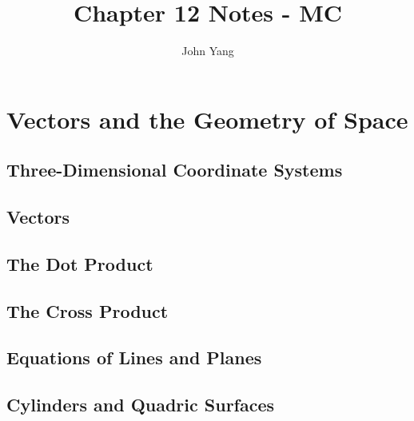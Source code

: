 \documentclass{article}
\title{Chapter 12 Notes - MC} %
\author{John Yang}
\begin{document}
    \maketitle
    \tableofcontents
    \section{Vectors and the Geometry of Space} %
    \subsection{Three-Dimensional Coordinate Systems} %
    \begin{outline}
        
    \end{outline}
    \subsection{Vectors}
    \begin{outline}
        
    \end{outline}
    \subsection{The Dot Product}
    \begin{outline}
        
    \end{outline}
    \subsection{The Cross Product}
    \begin{outline}
        
    \end{outline}
    \subsection{Equations of Lines and Planes}
    \begin{outline}
        
    \end{outline}
    \subsection{Cylinders and Quadric Surfaces}
    \begin{outline}
        
    \end{outline}
\end{document}
